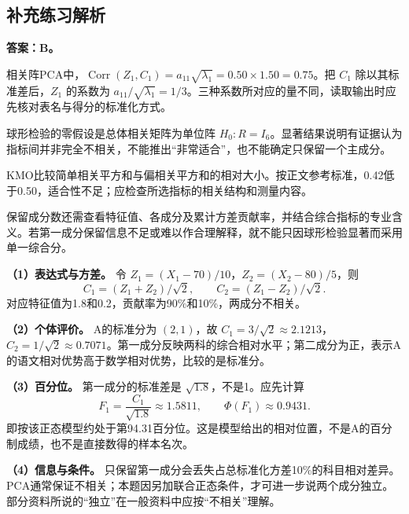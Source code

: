 \subsection{补充练习解析}


\textbf{答案：B。}

相关阵PCA中，\(\operatorname{Corr}(Z_1,C_1)=a_{11}\sqrt{\lambda_1}=0.50\times1.50=0.75\)。把 \(C_1\) 除以其标准差后，\(Z_1\) 的系数为 \(a_{11}/\sqrt{\lambda_1}=1/3\)。三种系数所对应的量不同，读取输出时应先核对表名与得分的标准化方式。





球形检验的零假设是总体相关矩阵为单位阵 \(H_0:R=I_6\)。显著结果说明有证据认为指标间并非完全不相关，不能推出``非常适合''，也不能确定只保留一个主成分。

KMO比较简单相关平方和与偏相关平方和的相对大小。按正文参考标准，0.42低于0.50，适合性不足；应检查所选指标的相关结构和测量内容。

保留成分数还需查看特征值、各成分及累计方差贡献率，并结合综合指标的专业含义。若第一成分保留信息不足或难以作合理解释，就不能只因球形检验显著而采用单一综合分。





\textbf{（1）表达式与方差。} 令 \(Z_1=(X_1-70)/10\)，\(Z_2=(X_2-80)/5\)，则 \[C_1=(Z_1+Z_2)/\sqrt2,\qquad C_2=(Z_1-Z_2)/\sqrt2.\] 对应特征值为1.8和0.2，贡献率为90\%和10\%，两成分不相关。

\textbf{（2）个体评价。} A的标准分为 \((2,1)\)，故 \(C_1=3/\sqrt2\approx2.1213\)，\(C_2=1/\sqrt2\approx0.7071\)。第一成分反映两科的综合相对水平；第二成分为正，表示A的语文相对优势高于数学相对优势，比较的是标准分。

\textbf{（3）百分位。} 第一成分的标准差是 \(\sqrt{1.8}\)，不是1。应先计算 \[F_1=\frac{C_1}{\sqrt{1.8}}\approx1.5811,\qquad \Phi(F_1)\approx0.9431.\] 即按该正态模型约处于第94.31百分位。这是模型给出的相对位置，不是A的百分制成绩，也不是直接数得的样本名次。

\textbf{（4）信息与条件。} 只保留第一成分会丢失占总标准化方差10\%的科目相对差异。PCA通常保证不相关；本题因另加联合正态条件，才可进一步说两个成分独立。部分资料所说的``独立''在一般资料中应按``不相关''理解。





